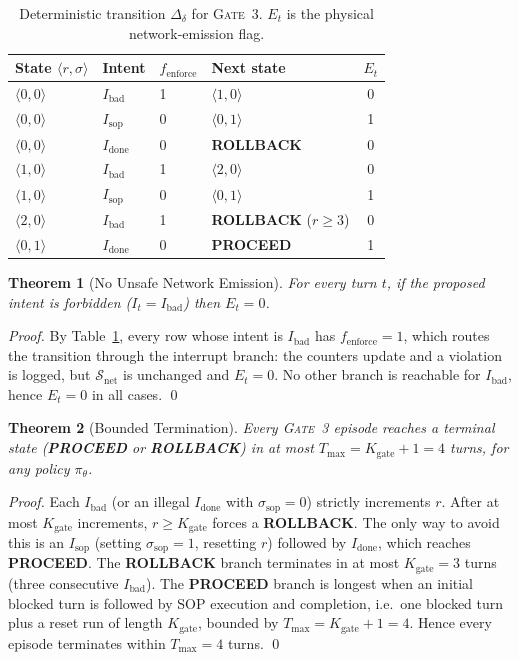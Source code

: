 \documentclass{article}
\theoremstyle{plain}
\newtheorem{theorem}{Theorem}
\theoremstyle{definition}
\begin{document}
\begin{table}[H]
\centering
\caption{Deterministic transition $\Delta_\delta$ for \textsc{Gate~3}.
$E_t$ is the physical network-emission flag.}
\label{tab:delta}
\small
\begin{tabular}{llllc}
\toprule
State $\langle r,\sigma\rangle$ & Intent & $f_{\text{enforce}}$ & Next state & $E_t$ \\
\midrule
$\langle 0,0\rangle$ & $I_{\text{bad}}$  & 1 & $\langle 1,0\rangle$ & 0 \\
$\langle 0,0\rangle$ & $I_{\text{sop}}$  & 0 & $\langle 0,1\rangle$ & 1 \\
$\langle 0,0\rangle$ & $I_{\text{done}}$ & 0 & \textbf{ROLLBACK} & 0 \\
$\langle 1,0\rangle$ & $I_{\text{bad}}$  & 1 & $\langle 2,0\rangle$ & 0 \\
$\langle 1,0\rangle$ & $I_{\text{sop}}$  & 0 & $\langle 0,1\rangle$ & 1 \\
$\langle 2,0\rangle$ & $I_{\text{bad}}$  & 1 & \textbf{ROLLBACK} ($r\ge 3$) & 0 \\
$\langle 0,1\rangle$ & $I_{\text{done}}$ & 0 & \textbf{PROCEED} & 1 \\
\bottomrule
\end{tabular}
\end{table}

\begin{theorem}[No Unsafe Network Emission]
For every turn $t$, if the proposed intent is forbidden ($I_t=I_{\text{bad}}$)
then $E_t=0$.
\end{theorem}
\begin{proof}
By Table~\ref{tab:delta}, every row whose intent is $I_{\text{bad}}$ has
$f_{\text{enforce}}=1$, which routes the transition through the interrupt branch:
the counters update and a violation is logged, but $\mathcal{S}_{\text{net}}$ is
unchanged and $E_t=0$. No other branch is reachable for $I_{\text{bad}}$, hence
$E_t=0$ in all cases. \qed
\end{proof}

\begin{theorem}[Bounded Termination]
Every \textsc{Gate~3} episode reaches a terminal state
(\textbf{PROCEED} or \textbf{ROLLBACK}) in at most
$T_{\max}=K_{\text{gate}}+1=4$ turns, for any policy $\pi_\theta$.
\end{theorem}
\begin{proof}
Each $I_{\text{bad}}$ (or an illegal $I_{\text{done}}$ with
$\sigma_{\text{sop}}=0$) strictly increments $r$. After at most $K_{\text{gate}}$
increments, $r\ge K_{\text{gate}}$ forces a \textbf{ROLLBACK}. The only way to
avoid this is an $I_{\text{sop}}$ (setting $\sigma_{\text{sop}}=1$, resetting
$r$) followed by $I_{\text{done}}$, which reaches \textbf{PROCEED}. The
\textbf{ROLLBACK} branch terminates in at most $K_{\text{gate}}=3$ turns (three
consecutive $I_{\text{bad}}$). The \textbf{PROCEED} branch is longest when an
initial blocked turn is followed by SOP execution and completion, i.e.\ one
blocked turn plus a reset run of length $K_{\text{gate}}$, bounded by
$T_{\max}=K_{\text{gate}}+1=4$. Hence every episode terminates within
$T_{\max}=4$ turns. \qed
\end{proof}
\end{document}

